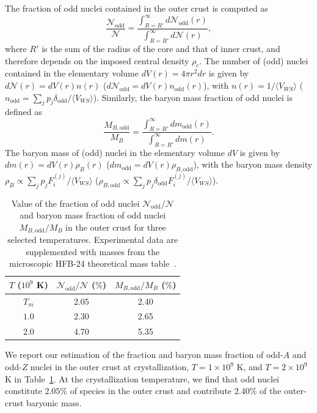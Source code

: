 The fraction of odd nuclei contained in the outer crust is computed as
%
\begin{equation}
  \frac{\mathcal{N}_{\text{odd}}}{\mathcal{N}} =
  \frac{\int_{R=R'}^\infty d\mathcal{N}_{\text{odd}}(r)}
  {\int_{R=R'}^\infty d\mathcal{N}(r)},
\end{equation}
%
where $R'$ is the sum of the radius of the core and that of inner crust, and 
therefore depends on the imposed central density $\rho_c$. The number of (odd)
nuclei contained in the elementary volume $dV(r)=4\pi r^2 dr$ is given by
$d\mathcal{N}(r) = dV(r)n(r)$ ($d\mathcal{N}_{\text{odd}} 
= dV(r)n_{\text{odd}}(r)$), with $n(r) = 1/\langle V_{WS}\rangle$
($n_{\text{odd}} = \sum_j p_j \delta_{\text{odd}} /\langle V_{WS}\rangle$).
%
Similarly, the baryon mass fraction of odd nuclei is defined as
%
\begin{equation}
  \frac{M_{B,\text{odd}}}{M_B} =
  \frac{\int_{R=R'}^\infty dm_{\text{odd}}(r)}
  {\int_{R=R'}^\infty d{m}(r)}.
\end{equation}
%
The baryon mass of (odd) nuclei in the elementary volume $dV$ is given by
$dm(r) = dV(r)\rho_B(r)$ ($dm_{\text{odd}} = dV(r)\rho_{B,\text{odd}}$), with
the baryon mass density $\rho_B \propto \sum_j p_j F_i^{(j)}/\langle
V_{WS}\rangle$ ($\rho_{B,\text{odd}} \propto \sum_j 
p_j\delta_{\text{odd}}F_i^{(j)}/\langle V_{WS}\rangle$).
%
\begin{table}
  \begin{center}
    \begin{tabular}{ccc} 
      \toprule
      \toprule
      $T$ ($10^9$ K) & $\mathcal{N}_{\text{odd}}/\mathcal{N}$ ($\%$) & 
      $M_{B,\text{odd}}/M_B$ ($\%$)\\
      \midrule
      $T_m$ & 2.05 & 2.40\\
      $1.0$ & 2.30 & 2.65\\
      $2.0$ & 4.70 & 5.35\\
      \bottomrule
      \bottomrule
    \end{tabular}
  \end{center}
  \caption[Value of the fraction and baryon mass fraction of odd nuclei in the
  outer crust for three selected temperatures]{Value of the fraction of odd 
    nuclei $\mathcal{N}_{\text{odd}}/\mathcal{N}$ and baryon mass fraction of 
    odd nuclei $M_{B,\text{odd}}/M_B$ in the outer crust for three selected 
  temperatures. 
  Experimental data are supplemented with masses from the microscopic 
  HFB-24 theoretical mass table~\cite{Goriely2013}.}\label{table:oddnuc} 
\end{table}
%
We report our estimation of the fraction and baryon mass fraction of odd-$A$
and odd-$Z$ nuclei in the outer crust at crystallization,
$T=1\times 10^9$ K, and $T=2\times 10^9$ K in Table~\ref{table:oddnuc}. At the
crystallization temperature, we find that odd nuclei constitute $2.05\%$ of 
species in the outer crust and contribute $2.40\%$ of the outer-crust baryonic 
mass.

